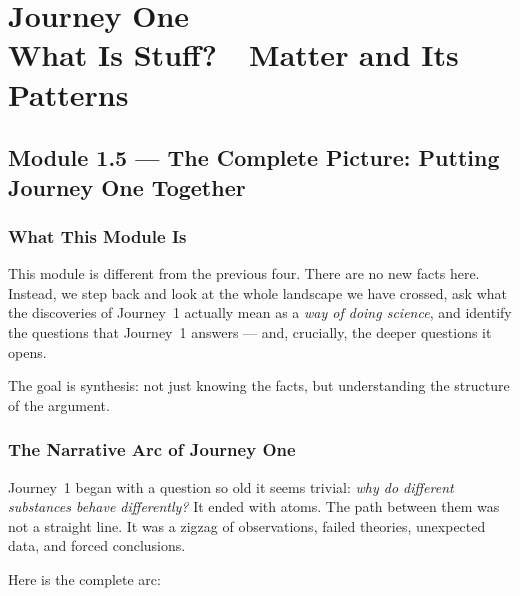 \documentclass[12pt, a4paper]{book}
\theoremstyle{definition}
\begin{document}
\setcounter{chapter}{0}
\chapter[Journey 1 --- What Is Stuff?]
        {Journey One\\[8pt]
         \textcolor{ModuleColor}{\large What Is Stuff?\ \ Matter and Its Patterns}}
\setcounter{section}{4}

\section{Module 1.5 --- The Complete Picture: Putting Journey One Together}
\label{sec:mod1.5}

\subsection*{What This Module Is}

This module is different from the previous four.
There are no new facts here.
Instead, we step back and look at the whole landscape
we have crossed, ask what the discoveries of Journey~1
actually mean as a \emph{way of doing science},
and identify the questions that Journey~1 answers ---
and, crucially, the deeper questions it opens.

The goal is synthesis: not just knowing the facts,
but understanding the structure of the argument.

\subsection{The Narrative Arc of Journey One}

Journey~1 began with a question so old it seems trivial:
\emph{why do different substances behave differently?}
It ended with atoms.
The path between them was not a straight line.
It was a zigzag of observations, failed theories,
unexpected data, and forced conclusions.

Here is the complete arc:
\end{document}
